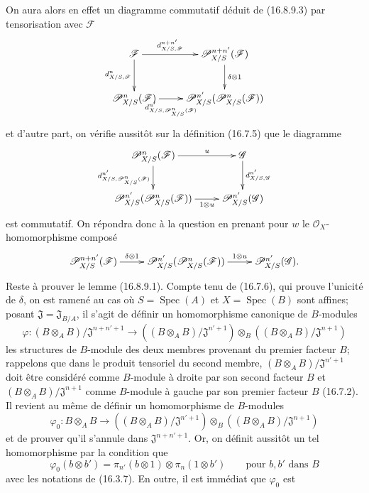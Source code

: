 On aura alors en effet un diagramme commutatif déduit de (16.8.9.3) par
tensorisation avec $\mathscr{F}$
\[
  \xymatrix{
    \mathscr{F}\ar[r]^-{d_{X/S,\mathscr{F}}^{n+n'}}
      \ar[d]_-{d_{X/S,\mathscr{F}}^n}
      &\mathscr{P}_{X/S}^{n+n'}(\mathscr{F})
        \ar[d]^-{\delta\otimes1}\\
    \mathscr{P}_{X/S}^n(\mathscr{F})
      \ar[r]_-{d_{X/S,\mathscr{P}_{X/S}^n(\mathscr{F})}^{n'}}
      &\mathscr{P}_{X/S}^{n'}(\mathscr{P}_{X/S}^n(\mathscr{F}))
  }
\]
et d'autre part, on vérifie aussitôt sur la définition (16.7.5) que le
diagramme
\[
  \xymatrix{
    \mathscr{P}_{X/S}^n(\mathscr{F})\ar[r]^-u
      \ar[d]_-{d_{X/S,\mathscr{P}_{X/S}^n(\mathscr{F})}^{n'}}
      &\mathscr{G}\ar[d]^-{d_{X/S,\mathscr{G}}^{n'}}\\
    \mathscr{P}_{X/S}^{n'}(\mathscr{P}_{X/S}^n(\mathscr{F}))
      \ar[r]_-{1\otimes u}
      &\mathscr{P}_{X/S}^{n'}(\mathscr{G})
  }
\]
est commutatif. On répondra donc à la question en prenant pour $w$ le
$\mathcal{O}_X$-homomorphisme composé
\[
  \xymatrix{
    \mathscr{P}_{X/S}^{n+n'}(\mathscr{F})
      \ar[r]^-{\delta\otimes1}
      &\mathscr{P}_{X/S}^{n'}(\mathscr{P}_{X/S}^n(\mathscr{F}))
        \ar[r]^-{1\otimes u}
      &\mathscr{P}_{X/S}^{n'}(\mathscr{G}).
  }
\]
Reste à prouver le lemme (16.8.9.1). Compte tenu de (16.7.6), qui prouve
l'unicité de $\delta$, on est ramené au cas où $S=\operatorname{Spec}(A)$ et
$X=\operatorname{Spec}(B)$ sont affines; posant
$\mathfrak{J}=\mathfrak{J}_{B/A}$, il s'agit de définir un homomorphisme
canonique de $B$-modules
\[
  \varphi:(B\otimes_A B)/\mathfrak{J}^{n+n'+1}
  \longrightarrow
  ((B\otimes_A B)/\mathfrak{J}^{n'+1})
  \otimes_B((B\otimes_A B)/\mathfrak{J}^{n+1})
\]
les structures de $B$-module des deux membres provenant du premier facteur
$B$; rappelons que dans le produit tensoriel du second membre,
$(B\otimes_A B)/\mathfrak{J}^{n'+1}$ doit être considéré
comme $B$-module à droite par son second facteur $B$ et
$(B\otimes_A B)/\mathfrak{J}^{n+1}$ comme $B$-module à gauche par son premier
facteur $B$ (16.7.2). Il revient au même de définir un homomorphisme de
$B$-modules
\[
  \varphi_0:B\otimes_A B\longrightarrow
  ((B\otimes_A B)/\mathfrak{J}^{n'+1})
  \otimes_B((B\otimes_A B)/\mathfrak{J}^{n+1})
\]
et de prouver qu'il s'annule dans $\mathfrak{J}^{n+n'+1}$. Or, on définit
aussitôt un tel homomorphisme par la condition que
\[
  \varphi_0(b\otimes b')
  =\pi_{n'}(b\otimes1)\otimes\pi_n(1\otimes b')
  \qquad\text{pour $b,b'$ dans $B$}
\]
avec les notations de (16.3.7). En outre, il est immédiat que $\varphi_0$ est

